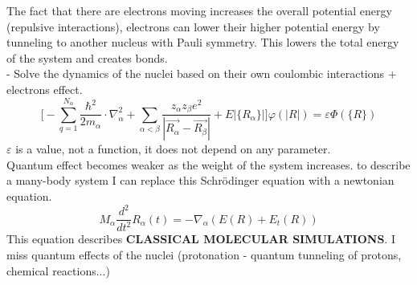 The fact that there are electrons moving increases the overall potential energy (repulsive interactions), electrons can lower their higher potential energy by tunneling to another nucleus with Pauli symmetry. This lowers the total energy of the system and creates bonds.\\
- Solve the dynamics of the nuclei based on their own coulombic interactions + electrons effect.
\[
\bigg[-\sum_{q=1}^{N_{\alpha}}\frac{\hbar^2}{2m_{\alpha}}\cdot\nabla_{\alpha}^2
+\sum_{\alpha<\beta}\frac{z_{\alpha}z_{\beta}e^2}{|\vec{R_{\alpha}}-\vec{R_{\beta}}|}+E|\{R_\alpha\}| \bigg]\varphi(|R|)=\varepsilon\varPhi(\{R\})
\]
$\varepsilon$ is a value, not a function, it does not depend on any parameter.\\
Quantum effect becomes weaker as the weight of the system increases. to describe a many-body system I can replace this Schr\"odinger equation with a newtonian equation.\\
\[
M_\alpha\frac{d^2}{dt^2}R_\alpha(t)=-\nabla_\alpha(E(R)+E_t(R))
\]
This equation describes \textbf{CLASSICAL MOLECULAR SIMULATIONS}. I miss quantum effects of the nuclei (protonation - quantum tunneling of protons, chemical reactions...)\\

